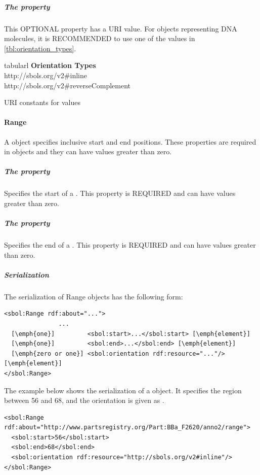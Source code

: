 \subparagraph{The  property}
\label{sec:orientation}
This OPTIONAL property has a URI value. For  objects representing DNA molecules, it is RECOMMENDED to use one of the values in \ref{tbl:orientation_types}. 

\begin{table}[ht]
  \begin{edtable}{tabular}{l}
    \toprule
    \textbf{Orientation Types}  \\
    \midrule
    http://sbols.org/v2\#inline\\
    http://sbols.org/v2\#reverseComplement\\
    \bottomrule
  \end{edtable}
  \caption{URI constants for  values}
  \label{tbl:orientation_types}
\end{table}


\paragraph{Range}
\label{sec:Range}
A  object specifies inclusive start and end positions. These properties are required in  objects and they can have  values greater than zero.

\subparagraph{The  property}\label{sec:start}
Specifies the start of a . This property is REQUIRED and can have  values greater than zero.

\subparagraph{The  property}\label{sec:end}
Specifies the end of a . This property is REQUIRED and can have  values greater than zero.

\subparagraph{Serialization}

The serialization of Range objects has the following form:
\begin{lstlisting}
<sbol:Range rdf:about="...">
               ...   
  [\emph{one}]         <sbol:start>...</sbol:start> [\emph{element}] 
  [\emph{one}]         <sbol:end>...</sbol:end> [\emph{element}] 
  [\emph{zero or one}] <sbol:orientation rdf:resource="..."/> [\emph{element}] 
</sbol:Range>
\end{lstlisting}

The example below shows the serialization of a  object. It specifies the region between 56 and 68, and the orientation is given as .
\begin{lstlisting}
<sbol:Range rdf:about="http://www.partsregistry.org/Part:BBa_F2620/anno2/range">
  <sbol:start>56</sbol:start>
  <sbol:end>68</sbol:end>
  <sbol:orientation rdf:resource="http://sbols.org/v2#inline"/>
</sbol:Range>
\end{lstlisting}

